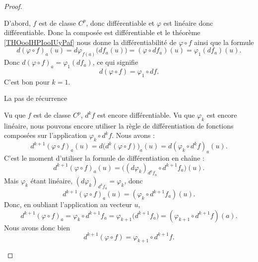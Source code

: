 \begin{proof}
\begin{subproof}
            D'abord, \( f\) est de classe \( C^p\), donc différentiable et \( \varphi\) est linéaire donc différentiable. Donc la composée est différentiable et le théorème \ref{THOooIHPIooIUyPaf} nous donne la différentiabilité de \( \varphi\circ f\) ainsi que la formule
            \begin{equation}
                d(\varphi\circ f)_a(u)=d\varphi_{f(a)}\big( df_a(u) \big)=(\varphi\circ df_a)(u)=\varphi_1(df_a)(u).
            \end{equation}
            Donc \( d(\varphi\circ f)_a=\varphi_1(df_a)\), ce qui signifie 
            \begin{equation}
                d(\varphi\circ f)=\varphi_1\circ df.
            \end{equation}
            C'est bon pour \( k=1\).


        \item[La pas de récurrence]

            Vu que \( f\) est de classe \( C^p\), \( d^kf\) est encore différentiable. Vu que \( \varphi_k\) est encore linéaire, nous pouvons encore utiliser la règle de différentiation de fonctions composées sur l'application \( \varphi_k\circ d^kf\). Nous avons :
            \begin{equation}
                d^{k+1}(\varphi\circ f)_a(u)=d\big( d^k(\varphi\circ f) \big)_a(u)=d(\varphi_k\circ d^kf)_a(u).
            \end{equation}
            C'est le moment d'utiliser la formule de différentiation en chaîne :
            \begin{equation}
                d^{k+1}(\varphi\circ f)_a(u)=\big( (d\varphi_k)_{d^kf_a}\circ d^{k+1}f_a \big)(u).
            \end{equation}
            Mais \( \varphi_k\) étant linéaire, \( (d\varphi_k)_{d^kf_a}=\varphi_k\), donc
            \begin{equation}
                d^{k+1}(\varphi\circ f)_a(u)=(\varphi_k\circ d^{k+1}f_a)(u).
            \end{equation}
            Donc, en oubliant l'application au vecteur \( u\),
            \begin{equation}
                d^{k+1}(\varphi\circ f)_a=\varphi_k\circ d^{k+1}f_a=\varphi_{k+1}\big( d^{k+1}f_a \big)=(\varphi_{k+1}\circ d^{k+1}f)(a).
            \end{equation}
            Nous avons donc bien
            \begin{equation}
                d^{k+1}(\varphi\circ f)=\varphi_{k+1}\circ d^{k+1}f.
            \end{equation}
    \end{subproof}
\end{proof}


